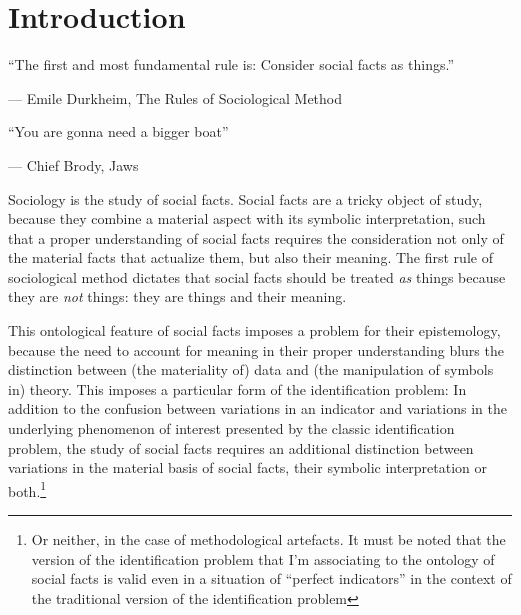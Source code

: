 \chapter*[Introduction]{Introduction}
\label{chap:intro}

\epigraph{
    ``The first and most fundamental rule is: Consider social facts as things.''
}{
    --- \textup{Emile Durkheim}, The Rules of Sociological Method
}
\nocite{durkheim1982}

\epigraph{
    ``You are gonna need a bigger boat''
}{
    --- \textup{Chief Brody}, Jaws
}

Sociology is the study of social facts.
Social facts are a tricky object of study, because they combine a material aspect with its symbolic interpretation, such that a proper understanding of social facts requires the consideration not only of the material facts that actualize them, but also their meaning.
The first rule of sociological method dictates that social facts should be treated \emph{as} things because they are \emph{not} things: they are things and their meaning.

This ontological feature of social facts imposes a problem for their epistemology, because the need to account for meaning in their proper understanding blurs the distinction between (the materiality of) data and (the manipulation of symbols in) theory.
This imposes a particular form of the identification problem:
In addition to the confusion between variations in an indicator and variations in the underlying phenomenon of interest presented by the classic identification problem, the study of social facts requires an additional distinction between variations in the material basis of social facts, their symbolic interpretation or both.\footnote{
    \label{foot:artefacts}
    Or neither, in the case of methodological artefacts. It must be noted that the version of the identification problem that I'm associating to the ontology of social facts is valid even in a situation of ``perfect indicators'' in the context of the traditional version of the identification problem
}

